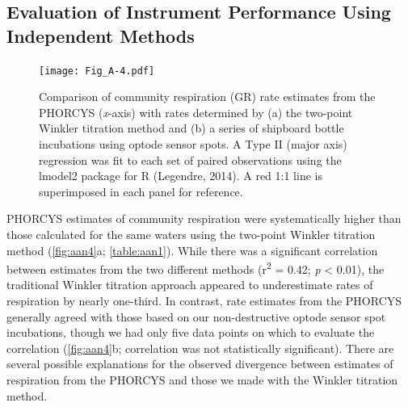\subsection{Evaluation of Instrument Performance Using Independent Methods}
\begin{figure}
\texttt{[image: Fig\_A-4.pdf]}
\caption[Comparison of community respiration rate estimates from the PHORCYS with two other methods]{Comparison of community respiration (GR) rate estimates from the PHORCYS (\emph{x}-axis) with rates determined by (a) the two-point Winkler titration method and (b) a series of shipboard bottle incubations using optode sensor spots. A Type II (major axis) regression was fit to each set of paired observations using the lmodel2 package for R (Legendre, 2014). A red 1:1 line is superimposed in each panel for reference.}
\label{fig:aan4}
\end{figure}
PHORCYS estimates of community respiration were systematically higher than those calculated for the same waters using the two-point Winkler titration method (\autoref{fig:aan4}a; \autoref{table:aan1}). While there was a significant correlation between estimates from the two different methods (r\textsuperscript{2} = 0.42; \emph{p} \textless{} 0.01), the traditional Winkler titration approach appeared to underestimate rates of respiration by nearly one-third. In contrast, rate estimates from the PHORCYS generally agreed with those based on our non-destructive optode sensor spot incubations, though we had only five data points on which to evaluate the correlation (\autoref{fig:aan4}b; correlation was not statistically significant). There are several possible explanations for the observed divergence between estimates of respiration from the PHORCYS and those we made with the Winkler titration method.
